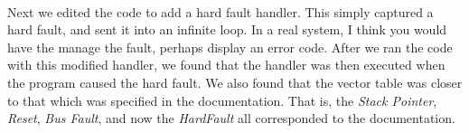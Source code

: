 \documentclass[12pt,a4paper]{report}
\begin{document}
\paragraph{}
Next we edited the code to add a hard fault handler. This simply captured a hard fault, and sent it into an infinite loop. In a real system, I think you would have the manage the fault, perhaps display an error code. After we ran the code with this modified handler, we found that the handler was then executed when the program caused the hard fault. We also found that the vector table was closer to that which was specified in the documentation. That is, the \emph{Stack Pointer}, \emph{Reset}, \emph{Bus Fault}, and now the \emph{HardFault} all corresponded to the documentation. 
\end{document}
